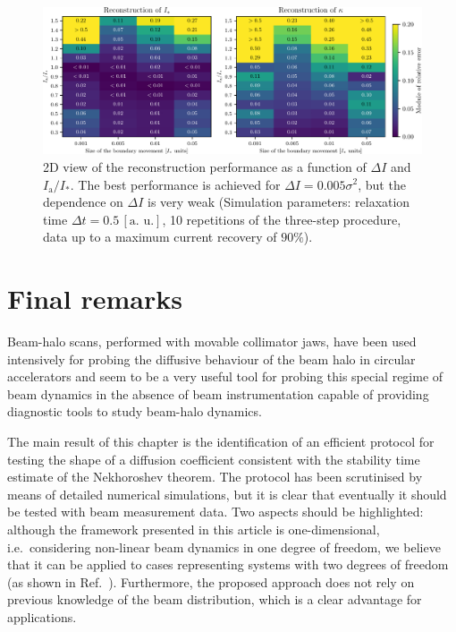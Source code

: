 {\begin{figure}[htp]
    \centering
    \includegraphics[width=\textwidth]{4_probing_the_diffusive_behavior/figs/final/MULTI_different_step_size.pdf}
    \caption{2D view of the reconstruction performance as a function of $\Delta I$ and $I_\mathrm{a}/I_\ast$. The  best performance is achieved for $\Delta I = 0.005 \sigma^2$, but the dependence on $\Delta I$ is very weak (Simulation parameters: relaxation time $\Delta t=0.5 \, [\text{a. u.}]$, 10 repetitions of the three-step procedure, data up to a maximum current recovery of $90\%$).}
    \label{fig:different_movement_module}
\end{figure}


\section{Final remarks}
\label{sec:conclusions}


Beam-halo scans, performed with movable collimator jaws, have been used intensively for probing the diffusive behaviour of the beam halo in circular accelerators and seem to be a very useful tool for probing this special regime of beam dynamics in the absence of beam instrumentation capable of providing diagnostic tools to study beam-halo dynamics.

{The main result of this chapter} is the identification of an efficient protocol for testing the shape of {a diffusion coefficient consistent with the stability time estimate of the Nekhoroshev theorem}. The protocol has been scrutinised by means of detailed numerical simulations, {but} it is clear that eventually it should be tested with beam measurement data. Two aspects should be highlighted: although the framework presented in this article is one-dimensional, i.e.\ considering non-linear beam dynamics in one degree of freedom, we believe that it can be applied to cases representing systems with two degrees of freedom (as shown in Ref.~\cite{bazzani2020diffusion}). Furthermore, the proposed approach does not rely on previous knowledge of the beam distribution, which is a clear advantage for applications. 
 
}
